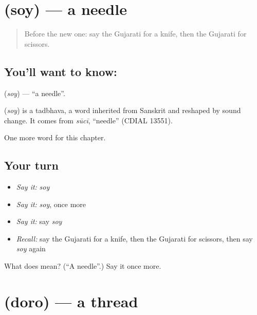 \section[\texorpdfstring{\gu{સોય} (soy)}{સોય (soy)}]{ (soy) — a needle}

\label{lesson:GU-C108-soy}



\begin{quote}
Before the new one: say the Gujarati for a knife, then the Gujarati for scissors.
\end{quote}

\subsection*{You'll want to know: }
\textbf{} (\emph{soy}) — \textquotedblleft{}a needle\textquotedblright{}.

\begin{cousinweb}
\textbf{} (\emph{soy}) is a tadbhava, a word inherited from Sanskrit and reshaped by sound change. It comes from \emph{sūcī}, \textquotedblleft{}needle\textquotedblright{} (CDIAL 13551).
\end{cousinweb}

\begin{grammarlens}[title={What you've built}]
One more word for this chapter.
\end{grammarlens}

\subsection*{Your turn}
\begin{itemize}
\raggedright
  \item \emph{Say it:} \emph{soy}
  \item \emph{Say it:} \emph{soy}, once more
  \item \emph{Say it:} say \emph{soy}
  \item \emph{Recall:} say the Gujarati for a knife, then the Gujarati for scissors, then say \emph{soy} again
\end{itemize}

\begin{tcolorbox}[breakable,colback=teal!4,colframe=teal!35!black,title={Before you move on}]
What does  mean? (\textquotedblleft{}A needle\textquotedblright{}.) Say it once more.
\end{tcolorbox}
\section[\texorpdfstring{\gu{દોરો} (doro)}{દોરો (doro)}]{ (doro) — a thread}


